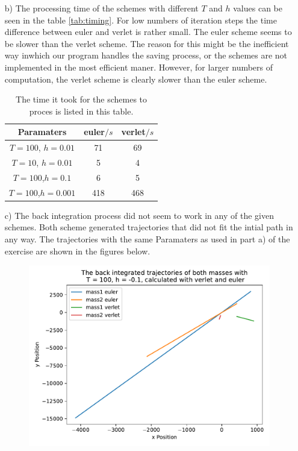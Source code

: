 \begin{itemize}
    \item[b)]
    The processing time of the schemes with different $T$ and $h$ values can be seen in the table \autoref{tab:timing}.
    For low numbers of iteration steps the time difference between euler and verlet is rather small.
    The euler scheme seems to be slower than the verlet scheme.
    The reason for this might be the inefficient way inwhich our program handles the saving process, or the schemes are not implemented in the most efficient maner.
    However, for larger numbers of computation, the verlet scheme is clearly slower than the euler scheme.
    \begin{table}
        \centering
        \caption{The time it took for the schemes to proces is listed in this table.
        }
        \begin{tabular}{ccc}
        \toprule
           Paramaters & euler$/s$ & verlet$/s$ \\
           \midrule
            $T=100$, $h=0.01$ & 71 & 69 \\ 
            $T=10$, $h=0.01$ & 5 & 4 \\
            $T=100$,$h=0.1$ & 6 & 5 \\
            $T=100$,$h=0.001$ & 418 & 468\\
           \bottomrule
        \end{tabular}
        \label{tab:timing}
    \end{table}
\FloatBarrier
    \item[c)]
    The back integration process did not seem to work in any of the given schemes.
    Both scheme generated trajectories that did not fit the intial path in any way.
    The trajectories with the same Paramaters as used in part a) of the exercise are shown in the figures below.
    \begin{figure}
        \centering
        \includegraphics[width=\textwidth]{plots/plotsT_100_01/plotd.pdf}

\end{figure}
\end{itemize}
